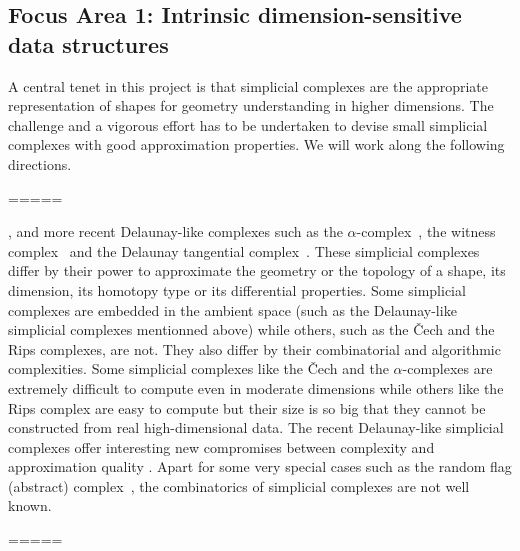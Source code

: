 \subsection*{Focus Area 1:  Intrinsic dimension-sensitive data structures} 

A central tenet in this project is that simplicial complexes are the appropriate representation of shapes  for geometry understanding in higher dimensions. 
The challenge and a vigorous effort has to be undertaken to devise small simplicial complexes with good approximation properties.
We will work along the following directions.

=====



, and more recent Delaunay-like complexes such as the $\alpha$-complex~\cite{he-ubds-95}, the witness complex~\cite{cds-tewc-2004} and the Delaunay tangential complex~\cite{geometrica-7142i}. These simplicial complexes differ by their power to approximate the geometry or the topology of a shape, its dimension, its homotopy type or its differential properties. Some simplicial complexes are embedded in the ambient space (such as the Delaunay-like simplicial complexes mentionned above) while others, such as the \v{C}ech and the Rips complexes, are not. They also differ by their combinatorial and algorithmic complexities. %
Some simplicial complexes like the \v{C}ech and the $\alpha$-complexes are extremely difficult to compute even in moderate dimensions while others like the Rips complex are easy to compute but their size is so big that they cannot be constructed from real high-dimensional data.  The recent Delaunay-like simplicial complexes offer interesting new compromises between complexity and approximation quality \cite{geometrica-7142i,cds-tewc-2004}.
Apart for some very special cases such as the random flag (abstract) complex~\cite{CambridgeJournals:2077252}, the combinatorics of simplicial complexes are not well known. 

=====

